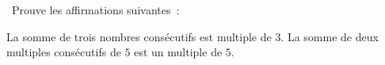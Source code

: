 %
%
~Prouve les affirmations suivantes~:
    \begin{tasks}
        \task La somme de trois nombres consécutifs est multiple de $3$.
        \task La somme de deux multiples consécutifs de $5$ est un multiple de $5$.
    \end{tasks}
